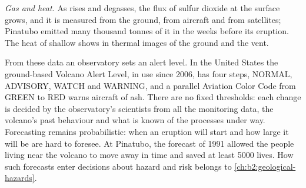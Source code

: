 \begin{omfigure}
\centering
{}
\par{}
\end{omfigure}

\emph{Gas and heat.} As  rises and degasses, the flux of sulfur dioxide at the
surface grows, and it is measured from the ground, from aircraft and from
satellites; Pinatubo emitted many thousand tonnes of it in the weeks before its eruption.
The heat of shallow  shows in thermal images of the ground and the vent.

From these data an observatory sets an alert level. In the United States the
ground-based Volcano Alert Level, in use since 2006, has four steps, NORMAL,
ADVISORY, WATCH and WARNING, and a parallel Aviation Color Code from GREEN to RED
warns aircraft of ash. There are no fixed thresholds: each change is decided by
the observatory's scientists from all the monitoring data, the volcano's past
behaviour and what is known of the processes under way. Forecasting remains
probabilistic: when an eruption will start and how large it will be are hard to
foresee. At Pinatubo, the forecast of 1991 allowed the people living near the
volcano to move away in time and saved at least \num{5000} lives. How such forecasts
enter decisions about hazard and risk belongs to \cref{ch:b2:geological-hazards}.


